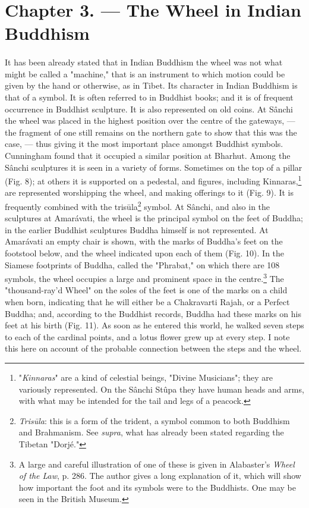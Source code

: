 \documentclass[a4paper, 11pt, oneside, polutonikogreek, english]{article}
\begin{document}
\section{Chapter 3. --- The Wheel in Indian Buddhism}
\paragraph{}
It has been already stated that in Indian Buddhism the wheel was not what might be called a "machine," that is an instrument to which motion could be given by the hand or otherwise, as in Tibet. Its character in Indian Buddhism is that of a symbol. It is often referred to in Buddhist books; and it is of frequent occurrence in Buddhist sculpture. It is also represented on old coins. At Sânchi the wheel was placed in the highest position over the centre of the gateways, --- the fragment of one still remains on the northern gate to show that this was the case, --- thus giving it the most important place amongst Buddhist symbols. Cunningham found that it occupied a similar position at Bharhut. Among the Sânchi sculptures it is seen in a variety of forms. Sometimes on the top of a pillar (Fig. 8); at others it is supported on a pedestal, and figures, including Kinnaras,\footnote{"\emph{Kinnaras}" are a kind of celestial beings, "Divine Musicians"; they are variously represented. On the Sânchi Stûpa they have human heads and arms, with what may be intended for the tail and legs of a peacock.} are represented worshipping the wheel, and making offerings to it (Fig. 9). It is frequently combined with the trisūla\footnote{\emph{Trisūla}: this is a form of the trident, a symbol common to both Buddhism and Brahmanism. See \emph{supra}, what has already been stated  regarding the Tibetan "Dorjé."} symbol. At Sânchi, and also in the sculptures at Amarávati, the wheel is the principal symbol on the feet of Buddha; in the earlier Buddhist sculptures Buddha himself is not represented. At Amarávati an empty chair is shown, with the marks of Buddha's feet on the footstool below, and the wheel indicated upon each of them (Fig. 10). In the Siamese footprints of Buddha, called the "Phrabat," on which there are 108 symbols, the wheel occupies a large and prominent space in the centre.\footnote{A large and careful illustration of one of these is given in Alabaster's \emph{Wheel of the Law}, p. 286. The author gives a long explanation of it, which will show how important the foot and its symbols were to the Buddhists. One may be seen in the British Museum.} The "thousand-ray'd Wheel" on the soles of the feet is one of the marks on a child when born, indicating that he will either be a Chakravarti Rajah, or a Perfect Buddha; and, according to the Buddhist records, Buddha had these marks on his feet at his birth (Fig. 11). As soon as he entered this world, he walked seven steps to each of the cardinal points, and a lotus flower grew up at every step. I note this here on account of the probable connection between the steps and the wheel.
\end{document}
